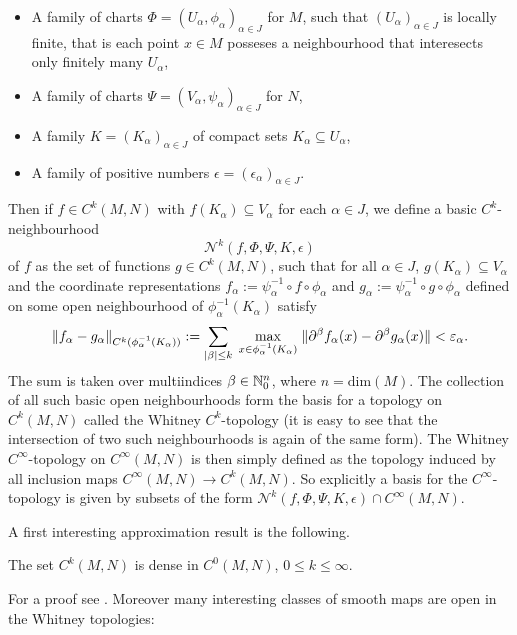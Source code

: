 \begin{itemize}
    \item A family of charts $\Phi = (U_\alpha,\phi_\alpha)_{\alpha\in J}$ for $M$, such that $(U_\alpha)_{\alpha\in J}$ is locally finite, that is each point $x \in M$ posseses a neighbourhood that interesects only finitely many $U_\alpha$,
    \item A family of charts $\Psi = (V_\alpha,\psi_\alpha)_{\alpha \in J}$ for $N$,
    \item A family $K= (K_\alpha)_{\alpha \in J}$ of compact sets $K_\alpha \subseteq U_\alpha$,
    \item A family of positive numbers $\epsilon = (\epsilon_\alpha)_{\alpha \in J}$.
\end{itemize} 

\noindent Then if $f \in C^k(M,N)$ with $f(K_\alpha) \subseteq V_\alpha$ for each $\alpha \in J$, we define a basic $C^k$-neighbourhood
\[
\mathcal{N}^k(f,\Phi,\Psi,K,\epsilon)
\]
of $f$ as the set of functions $g \in C^k(M,N)$, such that for all $\alpha \in J$, $g(K_\alpha) \subseteq V_\alpha$ and the coordinate representations $f_\alpha := \psi_\alpha^{-1} \circ f\circ\phi_\alpha$ and $g_\alpha := \psi_\alpha^{-1} \circ g\circ\phi_\alpha$ defined on some open neighbourhood of $\phi_\alpha^{-1}(K_\alpha)$ satisfy 
\[
\lVert f_\alpha - g_\alpha\rVert_{C^k(\phi_\alpha^{-1}(K_\alpha))} := \sum_{\lvert\beta\rvert \leq k} \; \max_{x \in \phi_\alpha^{-1}(K_\alpha)} \; \lVert\partial^\beta f_\alpha(x) - \partial^\beta g_\alpha(x)\rVert < \varepsilon_\alpha.
\]
The sum is taken over multiindices $\beta \in \mathbb{N}_0^n$, where $n = \mathrm{dim}(M)$. The collection of all such basic open neighbourhoods form the basis for a topology on $C^k(M,N)$ called the Whitney $C^k$-topology (it is easy to see that the intersection of two such neighbourhoods is again of the same form). The  Whitney $C^\infty$-topology on $C^\infty(M,N)$ is then simply defined as the topology induced by all inclusion maps $C^\infty(M,N) \to C^k(M,N)$. So explicitly a basis for the $C^\infty$-topology is given by subsets of the form $\mathcal{N}^k(f,\Phi,\Psi,K,\epsilon) \cap C^\infty(M,N)$.

A first interesting approximation result is the following.

\begin{theorem}
    \label{whitney_top:thm:C0_is_dense}
    The set $C^k(M,N)$ is dense in $C^0(M,N)$, $0\leq k \leq \infty$.
\end{theorem}

For a proof see \cite{hirsch2012differential}. Moreover many interesting classes of smooth maps are open in the Whitney topologies:


